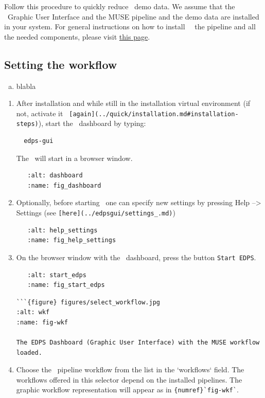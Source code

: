 Follow this procedure to quickly reduce \instname\ demo data. We
assume that the \edps\ Graphic User Interface and the MUSE pipeline
and the demo data are installed in your system. For general
instructions on how to install \edps\ \edpsgui\ the pipeline and all
the needed components, please visit
\href{https://www.eso.org/sci/software/pipe_aem_main.html}{this page}.


\subsection{Setting the workflow}

\begin{enumerate}[a)]
\item blabla
\end{enumerate}

\begin{enumerate}
\item After installation and while still in the installation virtual environment (if not, activate it \verb| [again](../quick/installation.md#installation-steps)|), start the \edpsgui\ dashboard by typing:

\begin{verbatim}
  edps-gui
\end{verbatim}

The \edpsgui\ will start in a browser window. 

\begin{verbatim}
   :alt: dashboard
   :name: fig_dashboard
\end{verbatim}

\item Optionally, before starting \edps\ one can specify new settings by pressing Help --> Settings (see \verb|[here](../edpsgui/settings_.md)|)

\begin{verbatim}
   :alt: help_settings
   :name: fig_help_settings
\end{verbatim}

\item On the browser window with the \edpsgui\ dashboard, press the button \texttt{Start EDPS}.

\begin{verbatim}
   :alt: start_edps
   :name: fig_start_edps
\end{verbatim}

\begin{verbatim}
```{figure} figures/select_workflow.jpg
:alt: wkf
:name: fig-wkf

The EDPS Dashboard (Graphic User Interface) with the MUSE workflow loaded.	
\end{verbatim}

\item Choose the \wkfname\ pipeline workflow from the list in the `workflows` field. The workflows offered in this selector depend on
the installed pipelines.
The graphic workflow representation will appear as in
\verb|{numref}`fig-wkf`|.

\end{enumerate}

